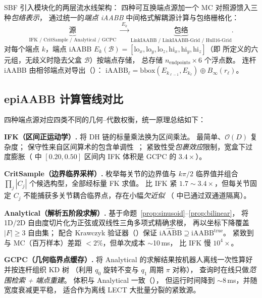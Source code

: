 \documentclass[journal]{IEEEtran}
\newcommand{\iAABB}{\mathrm{iAABB}}
\begin{document}
SBF 引入模块化的两层流水线架构：
四种可互换端点源加一个 MC 对照源馈入三种\emph{包络表示}，
通过统一的\emph{端点 iAABB} 中间格式解耦源计算与包络栅格化：
\begin{equation}\label{eq:pipeline}
  \underbrace{\text{源}}_{\text{IFK / CritSample / Analytical / GCPC}}
  \;\xrightarrow{\;E_k\;}
  \underbrace{\text{包络}}_{\text{LinkIAABB / LinkIAABB-Grid / Hull16-Grid}}.
\end{equation}
对每个端点 $k$，端点 iAABB
$E_k(\mathcal{B}) = [\mathrm{lo}_x, \mathrm{lo}_y, \mathrm{lo}_z,
\mathrm{hi}_x, \mathrm{hi}_y, \mathrm{hi}_z]$（即
所定义的六元组，无歧义时隐去父盒 $\mathcal{B}$）按端点存储，
总存储 $n_\text{endpoints} \times 6$ 个浮点数。
连杆 iAABB 由相邻端点对导出（）：
$\iAABB_\ell = \mathrm{bbox}(E_{k_{\ell-1}}, E_{k_\ell}) \oplus B_\infty(r_\ell)$。

\subsection{epiAABB 计算管线对比}\label{sec:epi_pipelines}

四种端点源对应四类不同的几何--代数权衡，统一原理总结如下：

\textbf{IFK（区间正运动学）.}
将 DH 链的标量乘法换为区间乘法。
最简单、$\mathcal{O}(D)$ 复杂度；
保守性来自区间算术的包含单调性~\cite{moore2009introduction,jaulin2001applied}；
紧致性受\emph{包裹效应}限制，宽盒下过度膨胀（ 中
$[0.20,0.50]$ 区间内 IFK 体积是 GCPC 的 $3.4\times$）。

\textbf{CritSample（边界临界采样）.}
枚举每关节的边界值与 $k\pi/2$ 临界值并组合
$\prod_j |C_j|$ 个候选构型，全部经标量 FK 求值。
比 IFK 紧 $1.7\!\sim\!3.4\times$，但每关节固定 $C_j$
不能捕获多关节耦合临界点，存在小幅\emph{欠近似}
（ 中已通过双通道隔离）。

\textbf{Analytical（解析五阶段求解）.}
基于命题~\ref{prop:sinusoid}--\ref{prop:bilinear}，
将 1D/2D 自由度切片化为正弦或双线性三角多项式精确求根，
再以坐标下降覆盖 $|F|\geq 3$ 自由集；
配合 Krawczyk 验证器（）保证
$\widehat{\iAABB}\supseteq\iAABB^\text{true}$。
紧致到与 MC（百万样本）差距 $<2\%$，但单次成本 $\sim$10\,ms，
比 IFK 慢 $10^4\times$。

\textbf{GCPC（几何临界点缓存）.}
将 Analytical 的求解结果按机器人离线一次性算好并按连杆组织 KD 树
（利用 $q_0$ 旋转不变与 $q_1$ 周期 $\pi$ 对称），
查询时在线只做\emph{范围检索 + 端点重建}。
体积与 Analytical 一致（），
但运行时间降到 $\sim\!8$\,ms，并随宽度衰减更平稳，
适合作为离线 LECT 大批量分裂的紧致源。
\end{document}
